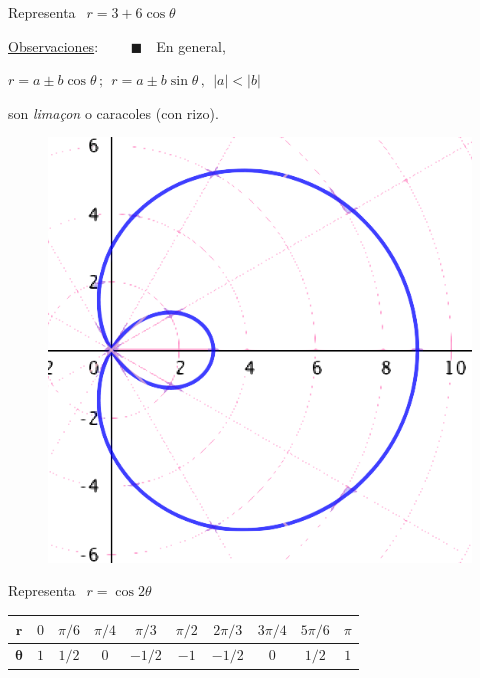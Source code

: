 \vspace{5mm}
\begin{mipropuesto}

Representa $\ \ r=3+6\cos \theta$
\end{mipropuesto}

\begin{multicols}{2}

\underline{Observaciones}: 
\tiny{$\qquad \blacksquare \quad $}\normalsize{En} general, 



\hspace{10mm}$r=a \pm b \cos \theta \, ; \ \ r=a \pm b \sin \theta\, , \ \ |a|<|b| $ 

\hspace{10mm}son \emph{limaçon} o caracoles (con rizo).


\begin{figure}[H]
	\centering
	\includegraphics[width=.2\textwidth]{img-polares/polares49.png}
\end{figure}
\end{multicols}

\vspace{5mm}

\begin{mipropuesto}

Representa $\ \ r=\cos 2\theta$
\end{mipropuesto}

\begin{table}[H]
\centering
\begin{tabular}{c|ccccccccc}
$\boldsymbol{r}$ & $0$ & $\pi/6$ & $\pi/4$  & $\pi/3$ & $\pi/2$ & $2\pi/3$ & $3\pi/4$ & $5\pi/6$ & $\pi$ \\ \hline
$\boldsymbol{\theta}$ & $1$ & $1/2$ & $0$ & $-1/2$ & $-1$ & $-1/2$ & $0$ & $1/2$ & $1$
\end{tabular}
\end{table}

